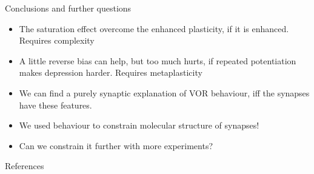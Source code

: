 \documentclass{beamer}%
\begin{document}

\begin{frame}{Conclusions and further questions}
%
 \begin{itemize}
   \item The saturation effect overcome the enhanced plasticity, if it is enhanced.
   \alert{Requires complexity}
   \item A little reverse bias can help, but too much hurts, if repeated potentiation makes depression harder.
   \alert{Requires metaplasticity}
   \item We can find a purely synaptic explanation of VOR behaviour, iff the synapses have these features. 
   \item We used behaviour to constrain molecular structure of synapses!
   \item Can we constrain it further with more experiments?
 \end{itemize}
%
\end{frame}


\begin{frame}[allowframebreaks]{References}
%

 {\small
 
 
 }
%
\end{frame}


\end{document}
